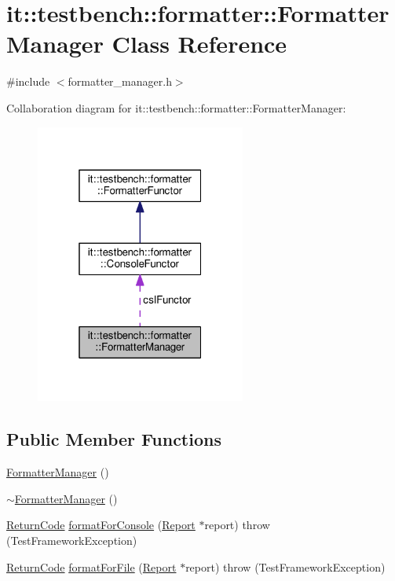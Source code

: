 \hypertarget{classit_1_1testbench_1_1formatter_1_1FormatterManager}{\section{it\-:\-:testbench\-:\-:formatter\-:\-:Formatter\-Manager Class Reference}
\label{da/daa/classit_1_1testbench_1_1formatter_1_1FormatterManager}
}


{\ttfamily \#include $<$formatter\-\_\-manager.\-h$>$}



Collaboration diagram for it\-:\-:testbench\-:\-:formatter\-:\-:Formatter\-Manager\-:
\nopagebreak
\begin{figure}[H]
\begin{center}
\leavevmode
\includegraphics[width=196pt]{db/d32/classit_1_1testbench_1_1formatter_1_1FormatterManager__coll__graph}
\end{center}
\end{figure}
\subsection*{Public Member Functions}
\begin{DoxyCompactItemize}
\item 
\hyperlink{classit_1_1testbench_1_1formatter_1_1FormatterManager_ae1eff4c36299f8f735786b0d8e9bf555}{Formatter\-Manager} ()
\item 
\hyperlink{classit_1_1testbench_1_1formatter_1_1FormatterManager_a9ca0354d66131a7c13766b1920411413}{$\sim$\-Formatter\-Manager} ()
\item 
\hyperlink{structit_1_1testbench_1_1data_1_1ReturnCode}{Return\-Code} \hyperlink{classit_1_1testbench_1_1formatter_1_1FormatterManager_a33569faa88b77304724dee5e7527e4cb}{format\-For\-Console} (\hyperlink{classit_1_1testbench_1_1data_1_1Report}{Report} $\ast$report)  throw (\-Test\-Framework\-Exception)
\item 
\hyperlink{structit_1_1testbench_1_1data_1_1ReturnCode}{Return\-Code} \hyperlink{classit_1_1testbench_1_1formatter_1_1FormatterManager_a5457654ded3f27226b4d23735b612901}{format\-For\-File} (\hyperlink{classit_1_1testbench_1_1data_1_1Report}{Report} $\ast$report)  throw (\-Test\-Framework\-Exception)
\end{DoxyCompactItemize}
